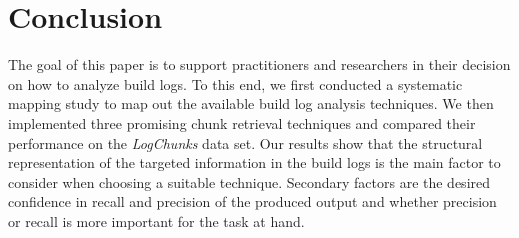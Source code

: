 \section{Conclusion}
\label{sec:conclusion-fw}
The goal of this paper is to support practitioners and researchers in
their decision on how to analyze build logs.
To this end, we first
conducted a systematic mapping study to map out the available build
log analysis techniques.
We then
implemented three promising chunk retrieval techniques and compared
their performance on the \emph{LogChunks} data set.
Our results show
that the structural representation of the targeted information in the
build logs is the main factor to consider when choosing a suitable
technique.
Secondary factors are the desired confidence in recall and
precision of the produced output and whether precision or recall is
more important for the task at hand.


